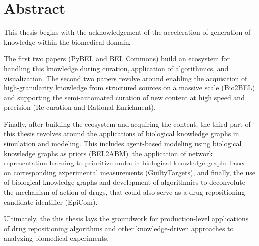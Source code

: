 \chapter*{Abstract}

This thesis begins with the acknowledgement of the acceleration of generation of knowledge within the biomedical domain.

The first two papers (PyBEL and BEL Commons) build an ecosystem for handling this knowledge during curation, application of algorithmics, and visualization.
The second two papers revolve around enabling the acquisition of high-granularity knowledge from structured sources on a massive scale (Bio2BEL) and supporting the semi-automated curation of new content at high speed and precision (Re-curation and Rational Enrichment).

Finally, after building the ecosystem and acquiring the content, the third part of this thesis revolves around the applications of biological knowledge graphs in simulation and modeling.
This includes agent-based modeling using biological knowledge graphs as priors (BEL2ABM), the application of network representation learning to prioritize nodes in biological knowledge graphs based on corresponding experimental measurements (GuiltyTargets), and finally, the use of biological knowledge graphs and development of algorithmics to deconvolute the mechanism of action of drugs, that could also serve as a drug repositioning candidate identifier (EpiCom).

Ultimately, the this thesis lays the groundwork for production-level applications of drug repositioning algorithms and other knowledge-driven approaches to analyzing biomedical experiments.
